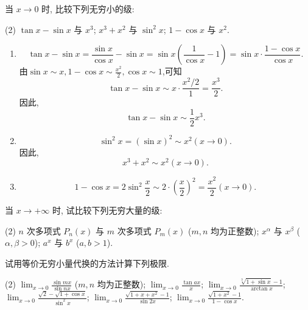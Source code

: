 \begin{exercise}[1.3.16]
    当 $x \to 0$ 时, 比较下列无穷小的级:
    \begin{tasks}[label=(\arabic*)](2)
        \task $\tan x - \sin x$ 与 $x^3$;
        \task $x^3+x^2$ 与 $\sin^2 x$;
        \task $1-\cos x$ 与 $x^2$.
    \end{tasks}
\end{exercise}

\begin{solution}
    \begin{enumerate}[(1)]
        \item $$\tan x - \sin x = \frac{\sin x}{\cos x} - \sin x = \sin x \left( \frac{1}{\cos x} - 1 \right) = \sin x \cdot \frac{1 - \cos x}{\cos x}.$$
              由$\sin x \sim x, 1 - \cos x \sim \frac{x^2}{2}, \cos x \sim 1$,可知$$\tan x - \sin x \sim x \cdot \frac{x^2 / 2}{1} = \frac{x^3}{2}.$$
              因此,$$\tan x - \sin x \sim \frac{1}{2} x^3.$$
        \item $$\sin^2 x = (\sin x)^2 \sim x^2  (x \to 0).$$
              因此,$$x^3 + x^2 \sim x^2 (x \to 0).$$
        \item $$1 - \cos x = 2 \sin^2 \frac{x}{2} \sim 2 \cdot \left( \frac{x}{2} \right)^2 = \frac{x^2}{2} (x \to 0).$$
    \end{enumerate}
\end{solution}

\begin{exercise}[1.3.17]
    当 $x \to +\infty$ 时, 试比较下列无穷大量的级:
    \begin{tasks}[label=(\arabic*)](2)
        \task $n$ 次多项式 $P_n(x)$ 与 $m$ 次多项式 $P_m(x)$ ($m,n$ 均为正整数);
        \task $x^\alpha$ 与 $x^\beta$ ($\alpha, \beta > 0$);
        \task $a^x$ 与 $b^x$ ($a, b > 1$).
    \end{tasks}
\end{exercise}

\begin{exercise}[1.3.18]
    试用等价无穷小量代换的方法计算下列极限.
    \begin{tasks}[label=(\arabic*)](2)
        \task $\lim_{x \to 0} \frac{\sin mx}{\sin nx}$ ($m, n$ 均为正整数);
        \task $\lim_{x \to 0} \frac{\tan ax}{x}$;
        \task $\lim_{x \to 0} \frac{\sqrt[3]{1+\sin x}-1}{\arctan x}$;
        \task $\lim_{x \to 0} \frac{\sqrt{2}-\sqrt{1+\cos x}}{\sin^2 x}$;
        \task $\lim_{x \to 0} \frac{\sqrt{1+x+x^2}-1}{\sin 2x}$;
        \task $\lim_{x \to 0} \frac{\sqrt{1+x^2}-1}{1-\cos x}$.
    \end{tasks}
\end{exercise}

